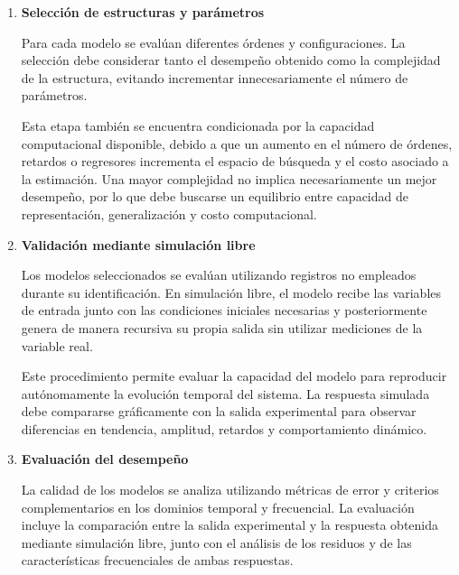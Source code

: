 \documentclass[11pt]{report}
\begin{document}
\begin{enumerate}
La identificación se desarrolla de manera progresiva, comenzando con estructuras de menor complejidad. En una primera etapa se analizan modelos lineales en configuración SISO, con el propósito de caracterizar la relación entre una entrada y la salida del sistema. Posteriormente, se incorporan múltiples entradas mediante estructuras lineales MISO. Si estas estructuras no permiten representar adecuadamente la dinámica observada, se procede a evaluar modelos MISO no lineales.

Esta progresión permite determinar en qué medida el aumento de complejidad estructural contribuye efectivamente a mejorar la representación del comportamiento térmico del sistema.



    
    \item \textbf{Selección de estructuras y parámetros}
   
    Para cada modelo se evalúan diferentes órdenes y configuraciones. La selección debe considerar tanto el desempeño obtenido como la complejidad de la estructura, evitando incrementar innecesariamente el número de parámetros.

Esta etapa también se encuentra condicionada por la capacidad computacional disponible, debido a que un aumento en el número de órdenes, retardos o regresores incrementa el espacio de búsqueda y el costo asociado a la estimación. Una mayor complejidad no implica necesariamente un mejor desempeño, por lo que debe buscarse un equilibrio entre capacidad de representación, generalización y costo computacional.
    \item \textbf{Validación mediante simulación libre}
    
    Los modelos seleccionados se evalúan utilizando registros no empleados durante su identificación. En simulación libre, el modelo recibe las variables de entrada junto con las condiciones iniciales necesarias y posteriormente genera de manera recursiva su propia salida sin utilizar mediciones de la variable real.

Este procedimiento permite evaluar la capacidad del modelo para reproducir autónomamente la evolución temporal del sistema. La respuesta simulada debe compararse gráficamente con la salida experimental para observar diferencias en tendencia, amplitud, retardos y comportamiento dinámico.

    \item \textbf{Evaluación del desempeño}

    La calidad de los modelos se analiza utilizando métricas de error y criterios complementarios en los dominios temporal y frecuencial. La evaluación incluye la comparación entre la salida experimental y la respuesta obtenida mediante simulación libre, junto con el análisis de los residuos y de las características frecuenciales de ambas respuestas.


\end{enumerate}
\end{document}
